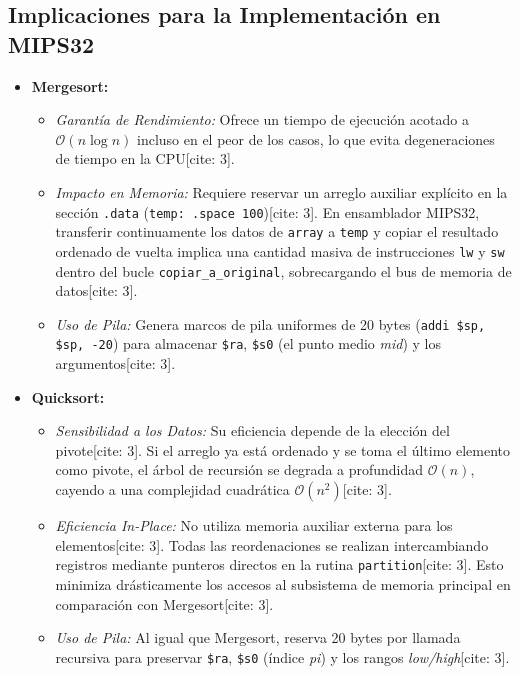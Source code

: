 \documentclass[12pt,a4paper]{article}
\begin{document}
\subsection{Implicaciones para la Implementación en MIPS32}
\begin{itemize}
    \item \textbf{Mergesort:}
    \begin{itemize}
        \item \textit{Garantía de Rendimiento:} Ofrece un tiempo de ejecución acotado a $\mathcal{O}(n \log n)$ incluso en el peor de los casos, lo que evita degeneraciones de tiempo en la CPU[cite: 3].
        \item \textit{Impacto en Memoria:} Requiere reservar un arreglo auxiliar explícito en la sección \texttt{.data} (\texttt{temp: .space 100})[cite: 3]. En ensamblador MIPS32, transferir continuamente los datos de \texttt{array} a \texttt{temp} y copiar el resultado ordenado de vuelta implica una cantidad masiva de instrucciones \texttt{lw} y \texttt{sw} dentro del bucle \texttt{copiar\_a\_original}, sobrecargando el bus de memoria de datos[cite: 3].
        \item \textit{Uso de Pila:} Genera marcos de pila uniformes de 20 bytes (\texttt{addi \$sp, \$sp, -20}) para almacenar \texttt{\$ra}, \texttt{\$s0} (el punto medio \textit{mid}) y los argumentos[cite: 3].
    \end{itemize}
    \item \textbf{Quicksort:}
    \begin{itemize}
        \item \textit{Sensibilidad a los Datos:} Su eficiencia depende de la elección del pivote[cite: 3]. Si el arreglo ya está ordenado y se toma el último elemento como pivote, el árbol de recursión se degrada a profundidad $\mathcal{O}(n)$, cayendo a una complejidad cuadrática $\mathcal{O}(n^2)$[cite: 3].
        \item \textit{Eficiencia In-Place:} No utiliza memoria auxiliar externa para los elementos[cite: 3]. Todas las reordenaciones se realizan intercambiando registros mediante punteros directos en la rutina \texttt{partition}[cite: 3]. Esto minimiza drásticamente los accesos al subsistema de memoria principal en comparación con Mergesort[cite: 3].
        \item \textit{Uso de Pila:} Al igual que Mergesort, reserva 20 bytes por llamada recursiva para preservar \texttt{\$ra}, \texttt{\$s0} (índice \textit{pi}) y los rangos \textit{low/high}[cite: 3].
    \end{itemize}
\end{itemize}
\end{document}
